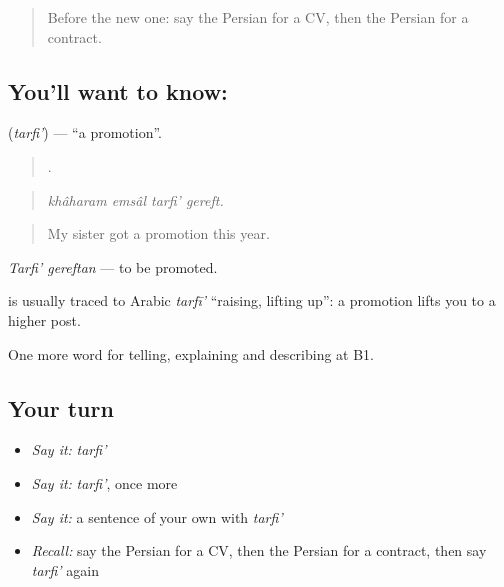 \label{lesson:FA-C380-tarfi}



\begin{quote}
Before the new one: say the Persian for a CV, then the Persian for a contract.
\end{quote}

\subsection*{You'll want to know: }
\textbf{} (\emph{tarfi'}) — \textquotedblleft{}a promotion\textquotedblright{}.

\begin{quote}
   .
\end{quote}

\begin{quote}
\emph{khâharam emsâl tarfi' gereft.}
\end{quote}

\begin{quote}
My sister got a promotion this year.
\end{quote}

\emph{Tarfi' gereftan} — to be promoted.

\begin{cousinweb}
\textbf{} is usually traced to Arabic \emph{tarfī'} \textquotedblleft{}raising, lifting up\textquotedblright{}: a promotion lifts you to a higher post.
\end{cousinweb}

\begin{grammarlens}[title={What you've built}]
One more word for telling, explaining and describing at B1.
\end{grammarlens}

\subsection*{Your turn}
\begin{itemize}
\raggedright
  \item \emph{Say it:} \emph{tarfi'}
  \item \emph{Say it:} \emph{tarfi'}, once more
  \item \emph{Say it:} a sentence of your own with \emph{tarfi'}
  \item \emph{Recall:} say the Persian for a CV, then the Persian for a contract, then say \emph{tarfi'} again
\end{itemize}

